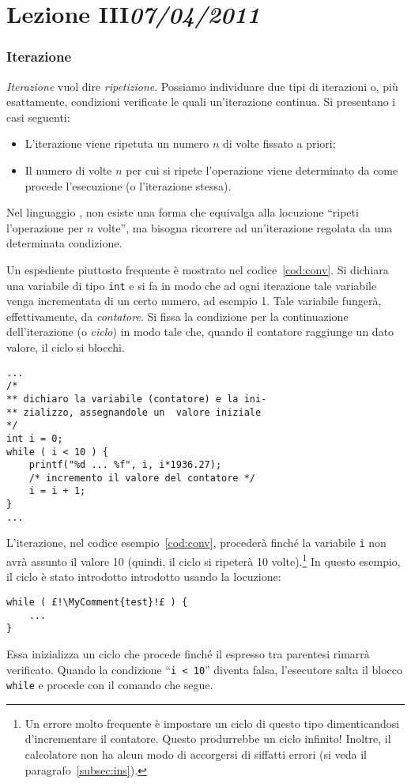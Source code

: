 \chapter[Lezione III]{Lezione III\newline\small{\emph{07/04/2011}}}
	\subsection{Iterazione}
	\label{sec:it}

\emph{Iterazione} vuol dire \emph{ripetizione}. Possiamo individuare due tipi di iterazioni o, più esattamente, condizioni verificate le quali un'iterazione continua.
Si presentano i casi seguenti:
\begin{itemize}
	\item
L'iterazione viene ripetuta un numero $n$ di volte fissato a priori;
	\item
Il numero di volte $n$ per cui si ripete l'operazione viene determinato da come procede l'esecuzione (o l'iterazione stessa).
\end{itemize}	
Nel linguaggio , non esiste una forma che equivalga alla locuzione ``ripeti l'operazione per $n$ volte'', ma bisogna ricorrere ad un'iterazione regolata da una determinata condizione.

Un espediente piuttosto frequente è mostrato nel codice~\vref{cod:conv}.
Si dichiara una variabile di tipo \lstinline!int! e si fa in modo che ad ogni iterazione tale variabile venga incrementata di un certo numero, ad esempio \num{1}.
Tale  variabile fungerà, effettivamente, da \emph{contatore}. Si fissa la condizione per la continuazione dell'iterazione (o \emph{ciclo}) in modo tale che, quando il contatore raggiunge un dato valore, il ciclo si blocchi.
\begin{lstlisting}[caption={{\em Tabella di conversione Euro/Lira.}}, label={cod:conv}]
...
/* 
** dichiaro la variabile (contatore) e la ini-
** zializzo, assegnandole un  valore iniziale
*/
int i = 0; 
while ( i < 10 ) {
	printf("%d ... %f", i, i*1936.27);
	/* incremento il valore del contatore */
	i = i + 1; 
}
...
\end{lstlisting}
L'iterazione, nel codice esempio~\ref{cod:conv}, procederà finché la variabile \lstinline!i! non avrà assunto il valore \num{10} (quindi, il ciclo si ripeterà \num{10} volte).\footnote{Un errore molto frequente è impostare un ciclo di questo tipo dimenticandosi d'incrementare il contatore. Questo produrrebbe un ciclo infinito! Inoltre, il calcolatore non ha alcun modo di accorgersi di siffatti errori (si veda il paragrafo~\ref{subsec:ins}).}
In questo esempio, il ciclo è stato introdotto introdotto usando la locuzione:
\begin{lstlisting}
while ( £!\MyComment{test}!£ ) {
	...
}
\end{lstlisting}
Essa inizializza un ciclo che  procede finché il  espresso tra parentesi rimarrà verificato. Quando la condizione ``\lstinline!i < 10!'' diventa falsa, l'esecutore salta il blocco \lstinline!while! e procede con il comando che segue.

